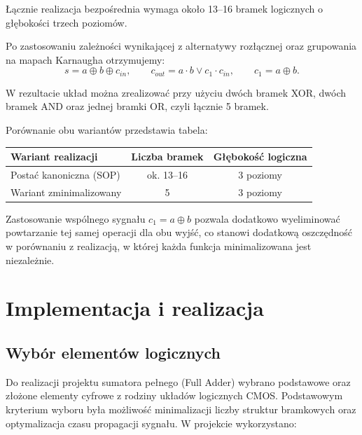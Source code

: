 \documentclass[12pt,a4paper]{article}
\begin{document}
Łącznie realizacja bezpośrednia wymaga około 13--16 bramek logicznych o głębokości trzech poziomów.

Po zastosowaniu zależności wynikającej z alternatywy rozłącznej oraz grupowania na mapach Karnaugha otrzymujemy:
\begin{equation*}
s = a \oplus b \oplus c_{in}, \qquad c_{out} = a \cdot b \vee c_1 \cdot c_{in}, \qquad c_1 = a \oplus b.
\end{equation*}

W rezultacie układ można zrealizować przy użyciu dwóch bramek XOR, dwóch bramek AND oraz jednej bramki OR, czyli łącznie 5 bramek.

Porównanie obu wariantów przedstawia tabela:

\begin{center}
\begin{tabular}{|l|c|c|}
\hline
\textbf{Wariant realizacji} & \textbf{Liczba bramek} & \textbf{Głębokość logiczna} \\
\hline
Postać kanoniczna (SOP) & ok. 13--16 & 3 poziomy \\
Wariant zminimalizowany & 5 & 3 poziomy \\
\hline
\end{tabular}
\end{center}

Zastosowanie wspólnego sygnału $c_1 = a \oplus b$ pozwala dodatkowo wyeliminować powtarzanie tej samej operacji dla obu wyjść, co stanowi dodatkową oszczędność w porównaniu z realizacją, w której każda funkcja minimalizowana jest niezależnie.


\section{Implementacja i realizacja}

\subsection{Wybór elementów logicznych}

Do realizacji projektu sumatora pełnego (Full Adder) wybrano podstawowe oraz złożone elementy cyfrowe z rodziny układów logicznych CMOS. Podstawowym kryterium wyboru była możliwość minimalizacji liczby struktur bramkowych oraz optymalizacja czasu propagacji sygnału. W projekcie wykorzystano:
\end{document}
